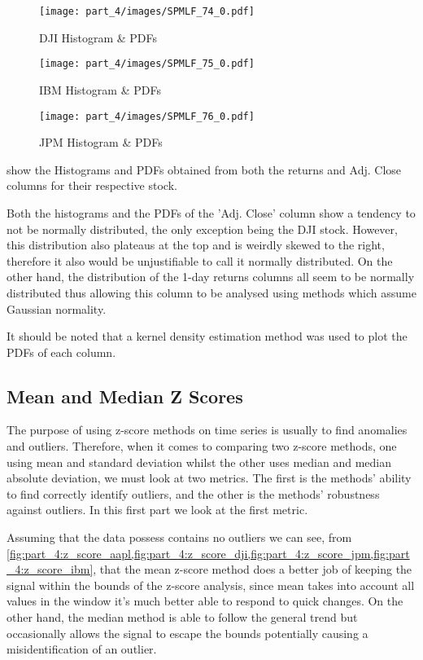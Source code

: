 \begin{figure}[!htb]
    \centering
    \texttt{[image: part\_4/images/SPMLF\_74\_0.pdf]}
    \caption{DJI Histogram \& PDFs}
    \label{fig:part_4:dji_pdf}
\end{figure}

\begin{figure}[!htb]
    \centering
    \texttt{[image: part\_4/images/SPMLF\_75\_0.pdf]}
    \caption{IBM Histogram \& PDFs}
    \label{fig:part_4:ibm_pdf}
\end{figure}

\begin{figure}[!htb]
    \centering
    \texttt{[image: part\_4/images/SPMLF\_76\_0.pdf]}
    \caption{JPM Histogram \& PDFs}
    \label{fig:part_4:jpm_pdf}
\end{figure}

 show the Histograms and PDFs obtained from both the returns and Adj. Close columns for their respective stock.

Both the histograms and the PDFs of the 'Adj. Close' column show a tendency to not be normally distributed, the only exception being the DJI stock. However, this distribution also plateaus at the top and is weirdly skewed to the right, therefore it also would be unjustifiable to call it normally distributed. On the other hand, the distribution of the 1-day returns columns all seem to be normally distributed thus allowing this column to be analysed using methods which assume Gaussian normality.

It should be noted that a kernel density estimation method was used to plot the PDFs of each column.

\subsection{Mean and Median Z Scores}

The purpose of using z-score methods on time series is usually to find anomalies and outliers. Therefore, when it comes to comparing two z-score methods, one using mean and standard deviation whilst the other uses median and median absolute deviation, we must look at two metrics. The first is the methods' ability to find correctly identify outliers, and the other is the methods' robustness against outliers. In this first part we look at the first metric.

Assuming that the data possess contains no outliers we can see, from  \cref{fig:part_4:z_score_aapl,fig:part_4:z_score_dji,fig:part_4:z_score_jpm,fig:part_4:z_score_ibm}, that the mean z-score method does a better job of keeping the signal within the bounds of the z-score analysis, since mean takes into account all values in the window it's much better able to respond to quick changes. On the other hand, the median method is able to follow the general trend but occasionally allows the signal to escape the bounds potentially causing a misidentification of an outlier.

